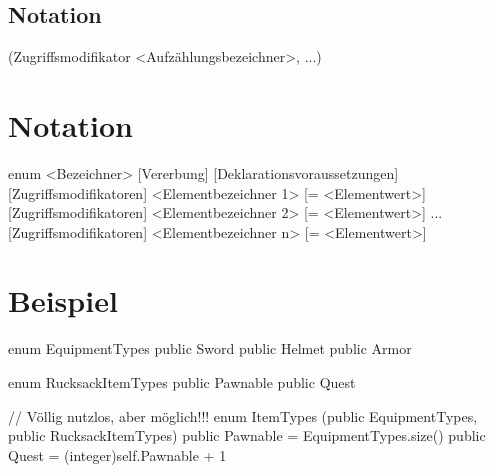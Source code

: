 \subsection{Notation}
(Zugriffsmodifikator <Aufzählungsbezeichner>, ...)

\section{Notation}
enum <Bezeichner> [Vererbung] [Deklarationsvoraussetzungen]
	[Zugriffsmodifikatoren] <Elementbezeichner 1> [= <Elementwert>]
	[Zugriffsmodifikatoren] <Elementbezeichner 2> [= <Elementwert>]
	...
	[Zugriffsmodifikatoren] <Elementbezeichner n> [= <Elementwert>]

\section{Beispiel}
enum EquipmentTypes
	public Sword
	public Helmet
	public Armor

enum RucksackItemTypes
	public Pawnable
	public Quest

// Völlig nutzlos, aber möglich!!!
enum ItemTypes (public EquipmentTypes, public RucksackItemTypes)
	public Pawnable = EquipmentTypes.size()
	public Quest = (integer)self.Pawnable + 1